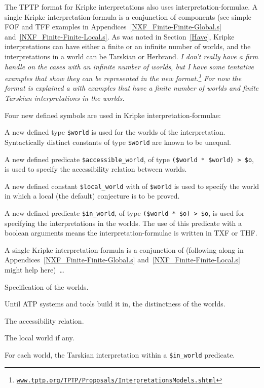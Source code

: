 \documentclass{easychair}
\newenvironment{packed_itemize}{
\vspace*{-0.3em}
\begin{itemize}
\setlength{\partopsep}{0pt}
\setlength{\itemsep}{1pt}
\setlength{\parskip}{0pt}
\setlength{\parsep}{0pt}
}{\end{itemize}}
\begin{document}
The TPTP format for Kripke interpretations also uses interpretation-formulae.
A single Kripke interpretation-formula is a conjunction of components (see simple FOF and TFF 
examples in Appendices~\ref{NXF_Finite-Finite-Global.s} and~\ref{NXF_Finite-Finite-Local.s}.
As was noted in Section~\ref{Have}, Kripke interpretations can have either a finite or an
infinite number of worlds, and the interpretations in a world can be Tarskian or Herbrand.
{\em I don't really have a firm handle on the cases with an infinite number of worlds, but I 
have some tentative examples that show they can be represented in the new format.\footnote{%
\href{https://www.tptp.org/TPTP/Proposals/InterpretationsModels.shtml\#KripkeInfiniteFinite}{{\tt www.tptp.org/TPTP/Proposals/InterpretationsModels.shtml}}}
For now the format is explained a with examples that have a finite number of worlds and finite
Tarskian interpretations in the worlds.}

Four new defined symbols are used in Kripke interpretation-formulae:
\begin{packed_itemize}
\item A new defined type {\tt \$world} is used for the worlds of the interpretation.
      Syntactically distinct constants of type {\tt \$world} are known to be unequal. 
\item A new defined predicate {\tt \$accessible\_world}, of type {\tt (\$world * \$world) > \$o},
      is used to specify the accessibility relation between worlds.
\item A new defined constant {\tt \$local\_world} with of {\tt \$world} is used to specify the
      world in which a local (the default) conjecture is to be proved. 
\item A new defined predicate {\tt \$in\_world}, of type {\tt (\$world * \$o) > \$o}, is used for 
      specifying the interpretations in the worlds.
      The use of this predicate with a boolean arguments means the interpretation-formulae is
      written in TXF or THF.
\end{packed_itemize}

A single Kripke interpretation-formula is a conjunction of (following along in 
Appendices~\ref{NXF_Finite-Finite-Global.s} and~\ref{NXF_Finite-Finite-Local.s} might help 
here)~\ldots
\begin{packed_itemize}
\item Specification of the worlds.
\item Until ATP systems and tools build it in, the distinctness of the worlds.
\item The accessibility relation.
\item The local world if any.
\item For each world, the Tarskian interpretation within a {\tt \$in\_world} predicate.
\end{packed_itemize}
\end{document}
